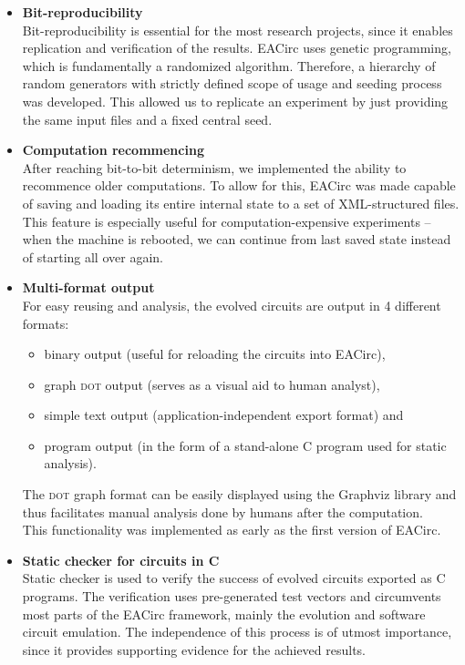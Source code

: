 \documentclass[12pt,oneside]{fithesis2}
\newcommand{\squarebullet}{\textcolor{black}{\raisebox{0.15em}{\rule{4pt}{4pt}}}}
\newenvironment{myItemize}{
  \begin{itemize}[leftmargin=2em,rightmargin=1em,itemsep=\parskip ,parsep=0em,topsep=0em,partopsep=0em]
  \renewcommand{\labelitemi}{\squarebullet}
  \renewcommand{\labelitemii}{$\diamond$}
}{
  \end{itemize}
}
\begin{document}
\begin{myItemize}
\item \textbf{Bit-reproducibility}\\
Bit-reproducibility is essential for the most research projects, since it enables replication and verification of the results.
EACirc uses genetic programming, which is fundamentally a randomized algorithm. Therefore, a hierarchy of random
generators with strictly defined scope of usage and seeding process was developed. This allowed us to replicate an experiment
by just providing the same input files and a fixed central seed.
\item \textbf{Computation recommencing}\\
After reaching bit-to-bit determinism, we implemented the ability to recommence older computations. 
To allow for this, EACirc was made capable of saving and loading its entire internal state to a set of XML-structured files.
This feature is especially useful for computation-expensive experiments -- when the machine is rebooted, we can continue from last saved state instead of starting all over again.
\item \textbf{Multi-format output}\\
For easy reusing and analysis, the evolved circuits are output in 4 different formats:
\begin{myItemize}
\item binary output (useful for reloading the circuits into EACirc),
\item graph \textsc{dot} output (serves as a visual aid to human analyst),
\item simple text output (application-independent export format) and
\item program output (in the form of a stand-alone C program used for static analysis).
\end{myItemize}
\noindent
The \textsc{dot} graph format can be easily displayed using the Graphviz library \parencite{graphviz} and thus 
facilitates manual analysis done by humans after the computation.\\
This functionality was implemented as early as the first version of EACirc. 
\item \textbf{Static checker for circuits in C}\\
Static checker is used to verify the success of evolved circuits exported as C programs. 
The verification uses pre-generated test vectors
and circumvents most parts of the EACirc framework, mainly the evolution and software circuit emulation.
The independence of this process is of utmost importance, since it provides supporting evidence for the achieved results.

\end{myItemize}
\end{document}

